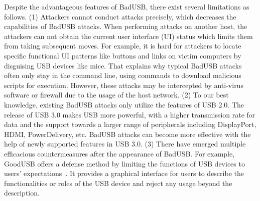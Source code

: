 Despite the advantageous features of BadUSB, there exist several limitations as follows.
(1) Attackers cannot conduct attacks precisely, which decreases the capabilities of BadUSB attacks.
When performing attacks on another host, the attackers can not obtain the current user interface (UI) status which limits them from taking subsequent moves.
For example, it is hard for attackers to locate specific functional UI patterns like buttons and links on victim computers by disguising USB devices like mice.
That explains why typical BadUSB attacks often only stay in the command line, using commands to download malicious scripts for execution.
However, these attacks may be intercepted by anti-virus software or firewall due to the usage of the host network.
(2) To our best knowledge, existing BadUSB attacks only utilize the features of USB 2.0.
The release of USB 3.0 makes USB more powerful, with a higher transmission rate for data and the support towards a larger range of peripherals including DisplayPort, HDMI, PowerDelivery, etc.
BadUSB attacks can become more effective with the help of newly supported features in USB 3.0.
(3) There have emerged multiple efficacious countermeasures after the appearance of BadUSB.
For example, GoodUSB offers a defense method by limiting the functions of USB devices to users' expectations~\cite{tian2015defending}.
It provides a graphical interface for users to describe the functionalities or roles of the USB device and reject any usage beyond the description.

